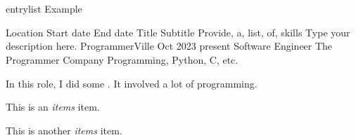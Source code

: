 \section{\faCode}{entrylist Example}
\begin{entrylist}
	\entry
	{Location}
	{Start date}
	{End date} %
	{Title}
	{Subtitle}
	{Provide, a, list, of, skills} %
	{Type your description here.}
	\entry
	{ProgrammerVille}
	{Oct 2023}
	{present} %
	{Software Engineer }
	{The Programmer Company}
	{Programming, Python, C, etc.} %
	{In this role, I did some . It involved a lot of programming.
		\begin{items}
			\item This is an \emph{items} item.
			\item This is another \emph{items} item.
		\end{items}
	}
\end{entrylist}